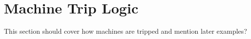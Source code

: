 \section{Machine Trip Logic}  
This section should cover how machines are tripped and mention later examples?